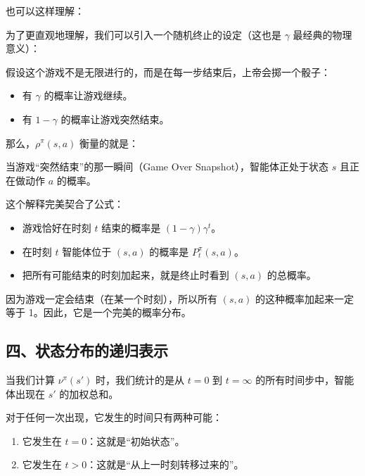 也可以这样理解：

为了更直观地理解，我们可以引入一个随机终止的设定（这也是 \(\gamma\) 最经典的物理意义）：

假设这个游戏不是无限进行的，而是在每一步结束后，上帝会掷一个骰子：

\begin{itemize}
\tightlist
\item
  有 \(\gamma\) 的概率让游戏继续。
\item
  有 \(1-\gamma\) 的概率让游戏突然结束。
\end{itemize}

那么，\(\rho^\pi(s,a)\) 衡量的就是：

当游戏``突然结束''的那一瞬间（Game Over Snapshot），智能体正处于状态 \(s\) 且正在做动作 \(a\) 的概率。

这个解释完美契合了公式：

\begin{itemize}
\tightlist
\item
  游戏恰好在时刻 \(t\) 结束的概率是 \((1-\gamma)\gamma^t\)。
\item
  在时刻 \(t\) 智能体位于 \((s,a)\) 的概率是 \(P_t^\pi(s,a)\)。
\item
  把所有可能结束的时刻加起来，就是终止时看到 \((s,a)\) 的总概率。
\end{itemize}

因为游戏一定会结束（在某一个时刻），所以所有 \((s,a)\) 的这种概率加起来一定等于 1。因此，它是一个完美的概率分布。

\hypertarget{ux56dbux72b6ux6001ux5206ux5e03ux7684ux9012ux5f52ux8868ux793a}{%
\subsection{四、状态分布的递归表示}\label{ux56dbux72b6ux6001ux5206ux5e03ux7684ux9012ux5f52ux8868ux793a}}

当我们计算 \(\nu^\pi(s')\) 时，我们统计的是从 \(t=0\) 到 \(t=\infty\) 的所有时间步中，智能体出现在 \(s'\) 的加权总和。

对于任何一次出现，它发生的时间只有两种可能：

\begin{enumerate}
\def\labelenumi{\arabic{enumi}.}
\tightlist
\item
  它发生在 \(t=0\)：这就是``初始状态''。
\item
  它发生在 \(t>0\)：这就是``从上一时刻转移过来的''。
\end{enumerate}

